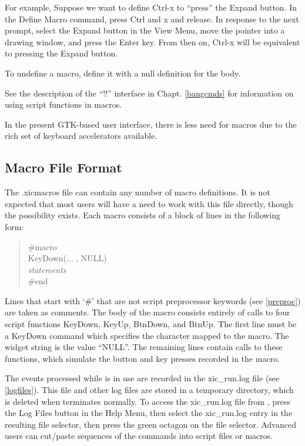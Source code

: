 For example, Suppose we want to define {\kb Ctrl-x} to ``press'' the
{\cb Expand} button.  In the {\cb Define Macro} command, press {\kb
Ctrl} and {\kb x} and release.  In response to the next prompt, select
the {\kb Expand} button in the {\cb View Menu}, move the pointer into
a drawing window, and press the {\kb Enter} key.  From then on, {\kb
Ctrl-x} will be equivalent to pressing the {\kb Expand} button.

To undefine a macro, define it with a null definition for the body.

See the description of the ``!!'' interface in Chapt.  \ref{bangcmds}
for information on using script functions in macros.

In the present GTK-based user interface, there is less need for
macros due to the rich set of keyboard accelerators available.

\subsection{Macro File Format}
The {\vt .xicmacros} file can contain any number of macro definitions. 
It is not expected that most users will have a need to work with this
file directly, though the possibility exists.  Each macro consists of
a block of lines in the following form:
\begin{quote}
{\vt \#macro}\\
{\vt KeyDown(... , NULL)}\\
{\it statements}\\
{\vt \#end}
\end{quote}

Lines that start with `{\vt \#}' that are not script preprocessor
keywords (see \ref{preproc}) are taken as comments.  The body of the
macro consists entirely of calls to four script functions {\vt
KeyDown}, {\vt KeyUp}, {\vt BtnDown}, and {\vt BtnUp}.  The first line
must be a {\vt KeyDown} command which specifies the character mapped
to the macro.  The widget string is the value ``{\vt NULL}''.  The
remaining lines contain calls to these functions, which simulate the
button and key presses recorded in the macro.

The events processed while {\Xic} is in use are recorded in the {\vt
xic\_run.log} file (see \ref{logfiles}).  This file and other log
files are stored in a temporary directory, which is deleted when
{\Xic} terminates normally.  To access the {\vt xic\_run.log} file
from {\Xic}, press the {\cb Log Files} button in the {\cb Help Menu},
then select the {\vt xic\_run.log} entry in the resulting file
selector, then press the green octagon on the file selector.  Advanced
users can cut/paste sequences of the commands into script files or
macros.


